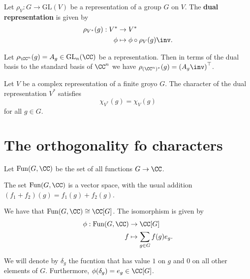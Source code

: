 \documentclass[12pt, a4paper]{article}
\newcommand{\gl}{\text{GL}}
\newcommand{\fun}{\text{Fun}}
\begin{document}
\begin{definition} 
    Let \(\rho_V : G \to \gl(V)\) be a representation of a group \(G\) on \(V\). The \textbf{dual representation} is given by 
    \[\begin{aligned}
        \rho_{V^*}(g) : V^* &\to V^* \\
        \phi &\mapsto \phi\circ \rho_V(g)\inv.
    \end{aligned}\]
\end{definition}

\begin{mdlemma}
    Let \(\rho_{\CC^n}(g)=A_g \in \gl_n(\CC)\) be a representation. Then in terms of the dual basis to the standard basis of \(\CC^n\) we have \(\rho_{(\CC^n)^*}(g) = \left( A_g\inv \right)^{\top}\).
\end{mdlemma}

\begin{corollary}
    Let \(V\) be a complex representation of a finite groyo \(G\). The character of the dual representation \(V^*\) satisfies 
    \[\chi_{V^*}(g)=\chi_V(g)\]
    for all \(g\in G\).
\end{corollary}

\section{The orthogonality fo characters}

\begin{definition}
    Let \(\fun(G,\CC)\) be the set of all functions \(G \to \CC\).
\end{definition}

\begin{proposition}
    The set \(\fun(G,\CC)\) is a vector space, with the usual addition \((f_1+f_2)(g)=f_1(g)+f_2(g)\).
\end{proposition}

\begin{proposition}
    We have that \(\fun(G,\CC) \cong \CC[G]\). The isomorphism is given by 
    \[\begin{aligned}
        \phi:\fun(G,\CC) &\to \CC[G] \\ 
        f &\mapsto \sum_{g\in G} f(g) e_g.
    \end{aligned}\]
\end{proposition}

\begin{definition}
    We will denote by \(\delta_g\) the fucntion that has value \(1\) on \(g\) and \(0\) on all other elements of \(G\). Furthermore, \(\phi(\delta_g)=e_g \in \CC[G]\).
\end{definition}
\end{document}
